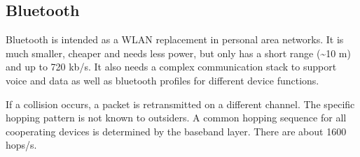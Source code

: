 \subsection{Bluetooth}
\begin{mytitle}[Bluetooth] Bluetooth is intended as a WLAN replacement in personal area networks. It is much smaller, cheaper and needs less power, but only has a short range (\textasciitilde 10 m) and up to 720 kb/s. It also needs a complex communication stack to support voice and data as well as bluetooth profiles for different device functions. 
\end{mytitle}

\begin{mytitle} If a collision occurs, a packet is retransmitted on a different channel. The specific hopping pattern is not known to outsiders. A common hopping sequence for all cooperating devices is determined by the baseband layer. There are about 1600 hops/s.
\end{mytitle}
